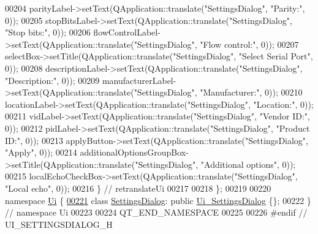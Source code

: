 \begin{DoxyCode}
00204         parityLabel->setText(QApplication::translate(\textcolor{stringliteral}{"SettingsDialog"}, \textcolor{stringliteral}{"Parity:"}, 0));
00205         stopBitsLabel->setText(QApplication::translate(\textcolor{stringliteral}{"SettingsDialog"}, \textcolor{stringliteral}{"Stop bits:"}, 0));
00206         flowControlLabel->setText(QApplication::translate(\textcolor{stringliteral}{"SettingsDialog"}, \textcolor{stringliteral}{"Flow control:"}, 0));
00207         selectBox->setTitle(QApplication::translate(\textcolor{stringliteral}{"SettingsDialog"}, \textcolor{stringliteral}{"Select Serial Port"}, 0));
00208         descriptionLabel->setText(QApplication::translate(\textcolor{stringliteral}{"SettingsDialog"}, \textcolor{stringliteral}{"Description:"}, 0));
00209         manufacturerLabel->setText(QApplication::translate(\textcolor{stringliteral}{"SettingsDialog"}, \textcolor{stringliteral}{"Manufacturer:"}, 0));
00210         locationLabel->setText(QApplication::translate(\textcolor{stringliteral}{"SettingsDialog"}, \textcolor{stringliteral}{"Location:"}, 0));
00211         vidLabel->setText(QApplication::translate(\textcolor{stringliteral}{"SettingsDialog"}, \textcolor{stringliteral}{"Vendor ID:"}, 0));
00212         pidLabel->setText(QApplication::translate(\textcolor{stringliteral}{"SettingsDialog"}, \textcolor{stringliteral}{"Product ID:"}, 0));
00213         applyButton->setText(QApplication::translate(\textcolor{stringliteral}{"SettingsDialog"}, \textcolor{stringliteral}{"Apply"}, 0));
00214         additionalOptionsGroupBox->setTitle(QApplication::translate(\textcolor{stringliteral}{"SettingsDialog"}, \textcolor{stringliteral}{"Additional options"},
       0));
00215         localEchoCheckBox->setText(QApplication::translate(\textcolor{stringliteral}{"SettingsDialog"}, \textcolor{stringliteral}{"Local echo"}, 0));
00216     \} \textcolor{comment}{// retranslateUi}
00217 
00218 \};
00219 
00220 \textcolor{keyword}{namespace }\hyperlink{a00055}{Ui} \{
\hypertarget{a00054_source_l00221}{}\hyperlink{a00023}{00221}     \textcolor{keyword}{class }\hyperlink{a00023}{SettingsDialog}: \textcolor{keyword}{public} \hyperlink{a00029}{Ui\_SettingsDialog} \{\};
00222 \} \textcolor{comment}{// namespace Ui}
00223 
00224 QT\_END\_NAMESPACE
00225 
00226 \textcolor{preprocessor}{#endif // UI\_SETTINGSDIALOG\_H}
\end{DoxyCode}
